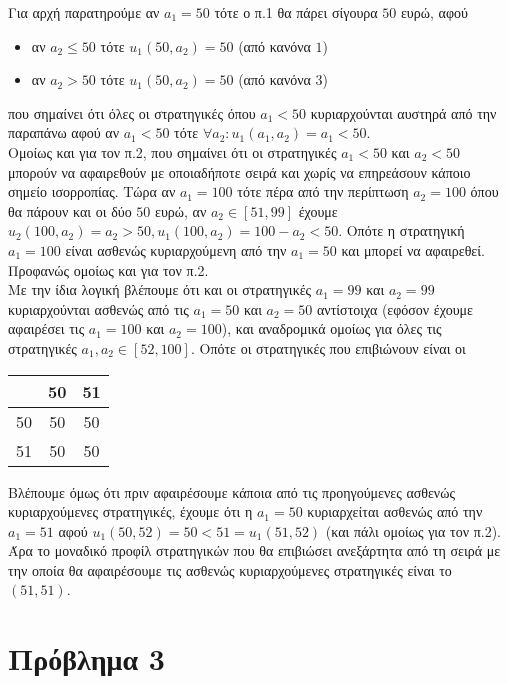 \documentclass[a4paper,11pt]{article}
\begin{document}
Για αρχή παρατηρούμε αν $a_1=50$ τότε ο π.1 θα πάρει σίγουρα $50$ ευρώ, αφού
\begin{itemize}
	\item αν $a_2 \leq 50$ τότε $u_1(50,a_2) = 50$ (από κανόνα $1$)
	\item αν $a_2 > 50$ τότε $u_1(50,a_2) = 50$ (από κανόνα $3$)
\end{itemize}
που σημαίνει ότι όλες οι στρατηγικές όπου $a_1<50$ κυριαρχούνται αυστηρά από την παραπάνω αφού αν $a_1<50$ τότε $\forall a_2: u_1(a_1,a_2) = a_1 < 50$.
\\
Ομοίως και για τον π.2, που σημαίνει ότι οι στρατηγικές $a_1<50$ και $a_2<50$ μπορούν να αφαιρεθούν με οποιαδήποτε σειρά και χωρίς να επηρεάσουν κάποιο σημείο ισορροπίας.
\newpage
Τώρα αν $a_1=100$ τότε πέρα από την περίπτωση $a_2=100$ όπου θα πάρουν και οι δύο $50$ ευρώ, αν $a_2 \in [51, 99]$ έχουμε $u_2(100,a_2)=a_2>50,u_1(100,a_2)=100-a_2<50$. Οπότε η στρατηγική $a_1=100$ είναι ασθενώς κυριαρχούμενη από την $a_1=50$ και μπορεί να αφαιρεθεί. Προφανώς ομοίως και για τον π.2.
\\[8pt]
Με την ίδια λογική βλέπουμε ότι και οι στρατηγικές $a_1=99$ και $a_2=99$ κυριαρχούνται ασθενώς από τις $a_1=50$ και $a_2=50$ αντίστοιχα (εφόσον έχουμε αφαιρέσει τις $a_1=100$ και $a_2=100$), και αναδρομικά ομοίως για όλες τις στρατηγικές $a_1,a_2 \in [52,100]$. Οπότε οι στρατηγικές που επιβιώνουν είναι οι
\begin{center}
	\begin{tabular}{c || c | c}
		& 50 & 51\\
		\hline\hline
		50 & 50 & 50\\
		51 & 50 & 50
	\end{tabular}
\end{center}
Βλέπουμε όμως ότι πριν αφαιρέσουμε κάποια από τις προηγούμενες ασθενώς κυριαρχούμενες στρατηγικές, έχουμε ότι η $a_1=50$ κυριαρχείται ασθενώς από την $a_1=51$ αφού $u_1(50,52) = 50 < 51 = u_1(51,52)$ (και πάλι ομοίως για τον π.2).
\\[8pt]
Άρα το μοναδικό προφίλ στρατηγικών που θα επιβιώσει ανεξάρτητα από τη σειρά με την οποία θα αφαιρέσουμε τις ασθενώς κυριαρχούμενες στρατηγικές είναι το $(51,51)$.


\section*{Πρόβλημα 3}
\end{document}
